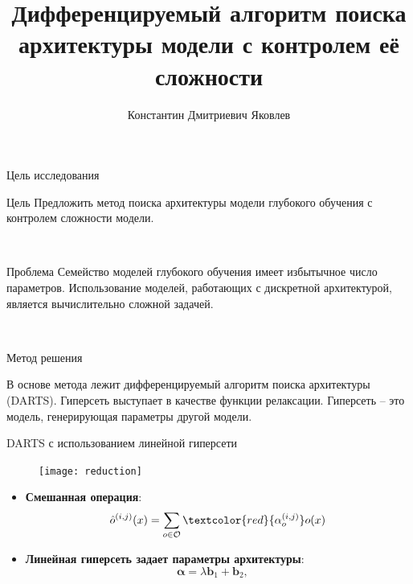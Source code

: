 \documentclass{beamer}
\title[\hbox to 56mm{Алгоритм поиска архитектуры}]{Дифференцируемый алгоритм поиска архитектуры модели с контролем её сложности}
\author[К.\,Д. Яковлев]{Константин Дмитриевич Яковлев}
\institute{Московский физико-технический институт}
\date{\footnotesize
\par\smallskip\emph{Курс:} Автоматизация научных исследований\par (практика, В.\,В.~Стрижов)/Группа 874
\par\smallskip\emph{Эксперт:} В.\,В.~Стрижов
\par\smallskip\emph{Консультант:} О.\,С.~Гребенькова, ~ О.\,Ю.~Бахтеев
\par\bigskip\small 2021}
\begin{document}
\begin{frame}
\thispagestyle{empty}
\maketitle
\end{frame}
\begin{frame}{Цель исследования}
\begin{block}{Цель} 
Предложить метод поиска архитектуры модели глубокого обучения с контролем сложности модели.
\end{block}

~\\
\begin{block}{Проблема}
Семейство моделей глубокого обучения имеет избытычное число параметров. Использование моделей, работающих с дискретной архитектурой, является вычислительно сложной задачей.
\end{block}
~\\
\begin{block}{Метод решения}

В основе метода лежит дифференцируемый алгоритм поиска архитектуры (DARTS). Гиперсеть выступает в качестве функции релаксации. Гиперсеть -- это модель, генерирующая параметры другой модели. 
\end{block}

\end{frame}
\begin{frame}{DARTS с использованием линейной гиперсети}


\begin{figure}
	\texttt{[image: reduction]}
\end{figure}


\begin{itemize}

\item \textbf{Смешанная операция}: $$\hat{o}^{(i, j)}(x) = \sum_{o\in\mathcal{O}}\textcolor{red}{\alpha^{(i, j)}_o}o(x)$$

\item \textbf{Линейная гиперсеть задает параметры архитектуры}: $$\mathbf{\alpha} = \lambda\mathbf{b}_1 + \mathbf{b}_2, \quad $$

\end{itemize}


\end{frame}
\end{document}
